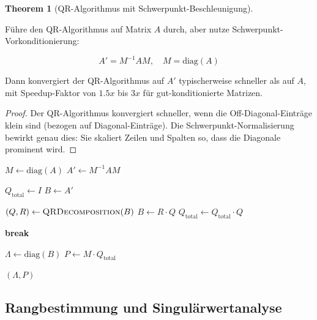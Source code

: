 \documentclass[a4paper,12pt]{article}
\theoremstyle{definition}
\newtheorem{theorem}{Theorem}
\begin{document}
\begin{theorem}[QR-Algorithmus mit Schwerpunkt-Beschleunigung]
\label{thm:qr_schwerpunkt}

Führe den QR-Algorithmus auf Matrix $A$ durch, aber nutze Schwerpunkt-Vorkonditionierung:

\[
A' = M^{-1} A M, \quad M = \text{diag}(A)
\]

Dann konvergiert der QR-Algorithmus auf $A'$ typischerweise schneller als auf $A$, mit Speedup-Faktor von $1.5x$ bis $3x$ für gut-konditionierte Matrizen.

\begin{proof}
Der QR-Algorithmus konvergiert schneller, wenn die Off-Diagonal-Einträge klein sind (bezogen auf Diagonal-Einträge). Die Schwerpunkt-Normalisierung bewirkt genau dies: Sie skaliert Zeilen und Spalten so, dass die Diagonale prominent wird.
\end{proof}
\end{theorem}

\begin{algorithm}[h]
\caption{QR-Algorithmus mit Schwerpunkt-Vorkonditionierung}
\label{alg:qr_schwerpunkt}
\begin{algorithmic}[1]
	\State $M \leftarrow \text{diag}(A)$ 
	\State $A' \leftarrow M^{-1} A M$
	
	\State $Q_{\text{total}} \leftarrow I$
	\State $B \leftarrow A'$
	
		\State $(Q, R) \leftarrow \textsc{QRDecomposition}(B)$
		\State $B \leftarrow R \cdot Q$ 
		\State $Q_{\text{total}} \leftarrow Q_{\text{total}} \cdot Q$
		
		 
			\State \textbf{break}
		\EndIf
	\EndFor
	
	\State $\Lambda \leftarrow \text{diag}(B)$ 
	\State $P \leftarrow M \cdot Q_{\text{total}}$ 
	
	\State \Return $(\Lambda, P)$
\EndProcedure
\end{algorithmic}
\end{algorithm}

\subsection{Rangbestimmung und Singulärwertanalyse}
\end{document}
